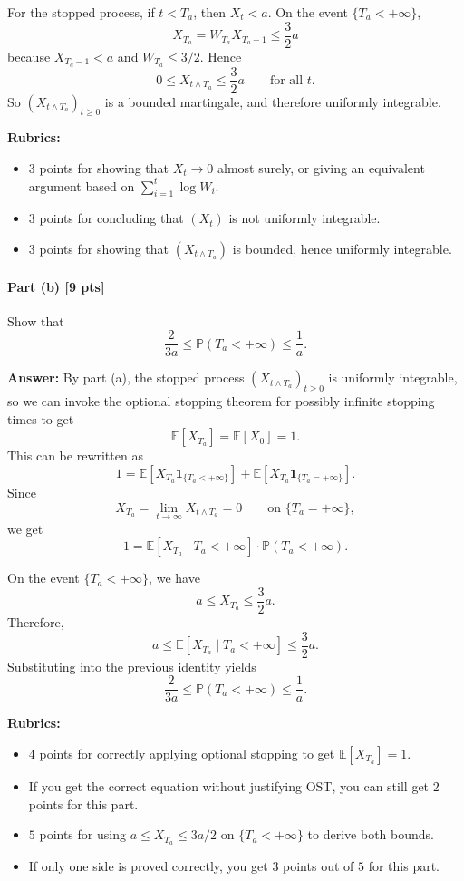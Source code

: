\documentclass[11pt]{article}
\theoremstyle{definition}
\begin{document}
For the stopped process, if \(t<T_a\), then \(X_t<a\). On the event \(\{T_a<+\infty\}\),
\[
X_{T_a}=W_{T_a}X_{T_a-1}\le \frac32 a
\]
because \(X_{T_a-1}<a\) and \(W_{T_a}\le 3/2\). Hence
\[
0\le X_{t\wedge T_a}\le \frac32 a
\qquad \text{for all } t.
\]
So \((X_{t\wedge T_a})_{t\ge 0}\) is a bounded martingale, and therefore uniformly integrable.

\textbf{Rubrics:}
\begin{itemize}[leftmargin=2em]
    \item \(3\) points for showing that \(X_t\to 0\) almost surely, or giving an equivalent argument based on \(\sum_{i=1}^t \log W_i\).
    \item \(3\) points for concluding that \((X_t)\) is not uniformly integrable.
    \item \(3\) points for showing that \((X_{t\wedge T_a})\) is bounded, hence uniformly integrable.
\end{itemize}

\paragraph{Part (b) \hfill [9 pts]}
Show that
\[
\frac{2}{3a}\le \mathbb P(T_a<+\infty)\le \frac{1}{a}.
\]

\textbf{Answer:}
By part (a), the stopped process \((X_{t\wedge T_a})_{t\ge 0}\) is uniformly integrable, so we can invoke the optional stopping theorem for possibly infinite stopping times to get
\[
\mathbb E[X_{T_a}]=\mathbb E[X_0]=1.
\]
This can be rewritten as
\[
1
=
\mathbb E[X_{T_a}\mathbf 1_{\{T_a<+\infty\}}]
+
\mathbb E[X_{T_a}\mathbf 1_{\{T_a=+\infty\}}].
\]
Since
\[
X_{T_a}=\lim_{t\to\infty} X_{t\wedge T_a}=0
\qquad \text{on } \{T_a=+\infty\},
\]
we get
\[
1
=
\mathbb E[X_{T_a}\mid T_a<+\infty]\cdot \mathbb P(T_a<+\infty).
\]

On the event \(\{T_a<+\infty\}\), we have
\[
a\le X_{T_a}\le \frac32 a.
\]
Therefore,
\[
a\le \mathbb E[X_{T_a}\mid T_a<+\infty]\le \frac32 a.
\]
Substituting into the previous identity yields
\[
\frac{2}{3a}\le \mathbb P(T_a<+\infty)\le \frac{1}{a}.
\]

\textbf{Rubrics:}
\begin{itemize}[leftmargin=2em]
    \item \(4\) points for correctly applying optional stopping to get \(\mathbb E[X_{T_a}]=1\).
    \item If you get the correct equation without justifying OST, you can still get \(2\) points for this part.
    \item \(5\) points for using \(a\le X_{T_a}\le 3a/2\) on \(\{T_a<+\infty\}\) to derive both bounds.
    \item If only one side is proved correctly, you get \(3\) points out of \(5\) for this part.
\end{itemize}
\end{document}
